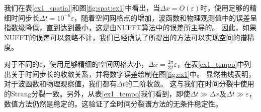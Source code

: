  我们在表\ref{ex1_spatial}和图\ref{fig:spat:ex1}中看出，当$\Delta x=O(\varepsilon)$时，使用足够的精细时间步长$\Delta t=10^{-6} \varepsilon$，随着空间网格点的增加，波函数和物理观测值中的误差呈指数级降低，直到达到最小，这是由NUFFT算法中的误差所主导的。 因此，如果NUFFT的误差可以忽略不计，我们已经确认了所提出的方法可以实现空间的谱精度。
 
 对于不同的$\varepsilon$，使用足够精细的空间网格大小，$\Delta x= \frac{2\pi}{32}\varepsilon$，在表\ref{ex1_tempo}中列出关于时间步长的收敛关系，并将数字误差绘制在图\ref{fig:ex1}中。 显然曲线表明，对于波函数和物理观察值，我们都有$\Delta t$的二阶收敛。 这与我们在时间分裂中使用的Strang分裂一致。另外，从表\ref{ex1_tempo}我们看到，即使$\Delta t \gg \Delta x$及$\Delta t \gg \varepsilon$，数值方法仍然是稳定的。这验证了全时间分裂谱方法的无条件稳定性。

